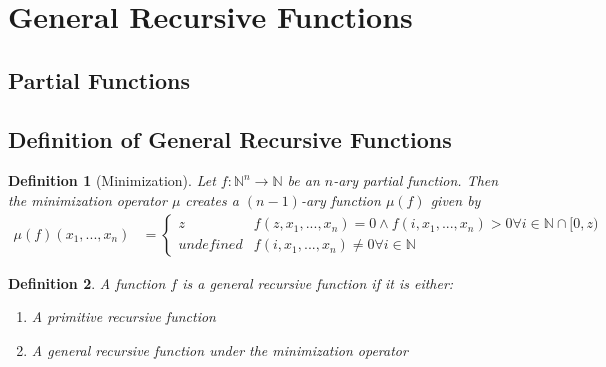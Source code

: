 \documentclass[12pt, letterpaper]{article}
\newtheorem*{definition}{Definition}
\theoremstyle{case}
\begin{document}
  \section{General Recursive Functions}
    \subsection{Partial Functions}
    \subsection{Definition of General Recursive Functions}
    \begin{definition}[Minimization]
      Let $f: \mathbb{N}^n \rightarrow \mathbb{N}$ be an $n$-ary partial function. Then the minimization operator $\mu$
      creates a $(n - 1)$-ary function $\mu(f)$ given by
      \begin{equation*}
        \begin{aligned}
          \mu(f)(x_1, ..., x_n) &=
          \begin{cases}
            z                       & f(z, x_1, ..., x_n) = 0 \wedge f(i, x_1, ..., x_n) > 0 \forall i \in \mathbb{N} \cap [0, z) \\
            undefined               & f(i, x_1, ..., x_n) \neq 0 \forall i \in \mathbb{N}
          \end{cases}
        \end{aligned}
      \end{equation*}
    \end{definition}
    \begin{definition}
      A function $f$ is a general recursive function if it is either:
      \begin{enumerate}
        \item A primitive recursive function
        \item A general recursive function under the minimization operator
      \end{enumerate}
    \end{definition}
\end{document}
